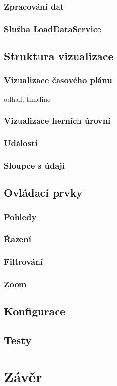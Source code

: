 \documentclass[
  digital, %
  oneside, %
  table,   %
  nolof,     %
  nolot,     %
]{fithesis3}
\begin{document}
\subsection{Zpracování dat}
\subsection{Služba LoadDataService}

\section{Struktura vizualizace}
\subsection{Vizualizace časového plánu}
odhad, timeline
\subsection{Vizualizace herních úrovní}
\subsection{Události}
\subsection{Sloupce s údaji}

\section{Ovládací prvky}
\subsection{Pohledy}
\subsection{Řazení}
\subsection{Filtrování}
\subsection{Zoom}

\section{Konfigurace}

\section{Testy}

\chapter{Závěr}

\printbibliography
\end{document}

